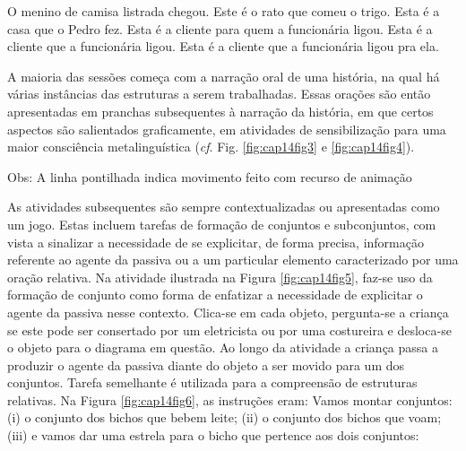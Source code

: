 \documentclass[output=paper,colorlinks,citecolor=brown,booklanguage=portuguese]{langscibook}
\begin{document}
\ea\label{ex:14:21}	O menino de camisa listrada chegou.
\z
\ea\label{ex:14:22} 	Este é o rato que comeu o trigo.
\z
\ea\label{ex:14:23} 	Esta é a casa que o Pedro fez.
\z
\ea\label{ex:14:24}
    \ea Esta é a cliente para quem a funcionária ligou.
    \ex Esta é a cliente que a funcionária ligou.
    \ex Esta é a cliente que a funcionária ligou pra ela.
    \z
\z

A maioria das sessões começa com a narração oral de uma história, na qual há várias instâncias das estruturas a serem trabalhadas. Essas orações são então a\-presentadas em pranchas subsequentes à narração da história, em que certos aspectos são salientados graficamente, em atividades de sensibilização para uma maior consciência metalinguística (\emph{cf}. Fig. \ref{fig:cap14fig3} e \ref{fig:cap14fig4}).


\begin{Figura}

{Obs: A linha pontilhada indica movimento feito com recurso de animação }
\caption{~}
\end{Figura}



\hspace*{-1.4pt}As atividades subsequentes são sempre contextualizadas ou apresentadas como um jogo. Estas incluem tarefas de formação de conjuntos e subconjuntos, com vista a sinalizar a necessidade de se explicitar, de forma precisa, informação referente ao agente da passiva ou a um particular elemento caracterizado por uma oração relativa.  Na atividade ilustrada na Figura \ref{fig:cap14fig5}, faz-se uso da formação de conjunto como forma de enfatizar a necessidade de explicitar o agente da passiva nesse contexto. Clica-se em cada objeto, pergunta-se a criança se este pode ser consertado por um eletricista ou por uma costureira e desloca-se o objeto para o diagrama em questão. Ao longo da atividade a criança passa a produzir o agente da passiva diante do objeto a ser movido para um dos conjuntos. Tarefa semelhante é utilizada para a compreensão de estruturas relativas. Na Figura \ref{fig:cap14fig6}, as instruções eram: Vamos montar conjuntos: (i) o conjunto dos bichos que bebem leite; (ii) o conjunto dos bichos que voam; (iii) e vamos dar uma estrela para o bicho que pertence aos dois conjuntos:
\end{document}
